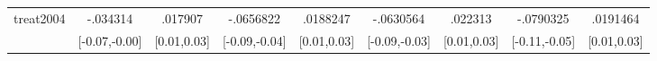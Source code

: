 \begin{table}[htbp]
\begin{tabular}{l*{8}{c}}
treat2004   &    -.034314\sym{*}  &     .017907\sym{**} &   -.0656822\sym{***}&    .0188247\sym{***}&   -.0630564\sym{***}&     .022313\sym{***}&   -.0790325\sym{***}&    .0191464\sym{***}\\
            &[-0.07,-0.00]         & [0.01,0.03]         &[-0.09,-0.04]         & [0.01,0.03]         &[-0.09,-0.03]         & [0.01,0.03]         &[-0.11,-0.05]         & [0.01,0.03]         \\
\hline\hline
\end{tabular}
\end{table}
